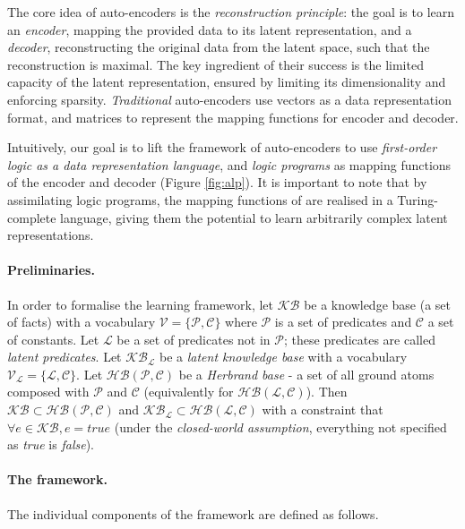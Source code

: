 The core idea of auto-encoders is the \textit{reconstruction principle}: the goal is to learn an \textit{encoder}, mapping the provided data to its latent representation, and a \textit{decoder}, reconstructing the original data from the latent space, such that the reconstruction is maximal.
The key ingredient of their success is the limited capacity of the latent representation, ensured by limiting its dimensionality and enforcing sparsity.
\textit{Traditional} auto-encoders use vectors as a data representation format, and matrices to represent the mapping functions for encoder and decoder.


Intuitively, our goal is to lift the framework of auto-encoders to use \textit{first-order logic as a data representation language},  and \textit{logic programs} as mapping functions of the encoder and decoder (Figure \ref{fig:alp}).
It is important to note that by assimilating logic programs, the mapping functions of  are realised in a Turing-complete language, giving them the potential to learn arbitrarily complex latent representations.




\paragraph{Preliminaries.}
In order to formalise the learning framework, let $\mathcal{KB}$ be a knowledge base (a set of facts) with a vocabulary $\mathcal{V} = \{ \mathcal{P}, \mathcal{C}\}$ where $\mathcal{P}$ is a set of predicates and $\mathcal{C}$ a set of constants.
Let $\mathcal{L}$ be a set of predicates not in $\mathcal{P}$; these predicates are called \textit{latent predicates}.
Let $\mathcal{KB}_{\mathcal{L}}$ be a \textit{latent knowledge base} with a vocabulary $\mathcal{V}_{\mathcal{L}} = \{\mathcal{L}, \mathcal{C}\}$.
Let $\mathcal{HB(P,C)}$ be a \textit{Herbrand base} - a set of all ground atoms composed with $\mathcal{P}$ and $\mathcal{C}$ (equivalently for $\mathcal{HB(L,C)}$).
Then $\mathcal{KB} \subset \mathcal{HB(P,C)}$ and $\mathcal{KB}_{\mathcal{L}} \subset \mathcal{HB(L,C)}$ with a constraint that $\forall e \in \mathcal{KB}, e = true$ (under the \textit{closed-world assumption}, everything not specified as \textit{true} is \textit{false}).



\paragraph{The framework.}
The individual components of the framework are defined as follows.



